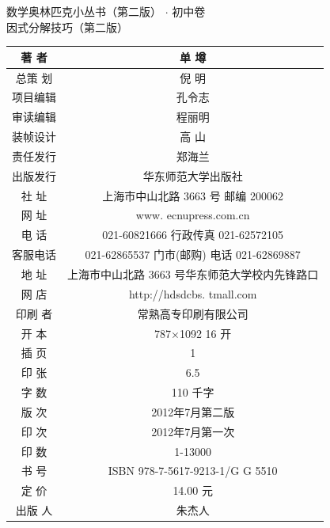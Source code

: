 \documentclass[10pt]{article}
\begin{document}
数学奥林匹克小丛书（第二版） $\cdot$ 初中卷\\
因式分解技巧（第二版）

\begin{center}
\begin{tabular}{|c|c|}
\hline
著 者 & 单 墫 \\
\hline
总策 划 & 倪 明 \\
\hline
项目编辑 & 孔令志 \\
\hline
审读编辑 & 程丽明 \\
\hline
装帧设计 & 高 山 \\
\hline
责任发行 & 郑海兰 \\
\hline
出版发行 & 华东师范大学出版社 \\
\hline
社 址 & 上海市中山北路 3663 号 邮编 200062 \\
\hline
网 址 & www. ecnupress.com.cn \\
\hline
电 话 & 021-60821666 行政传真 021-62572105 \\
\hline
客服电话 & 021-62865537 门市(邮购) 电话 021-62869887 \\
\hline
地 址 & 上海市中山北路 3663 号华东师范大学校内先锋路口 \\
\hline
网 店 & http://hdsdcbs. tmall.com \\
\hline
印刷 者 & 常熟高专印刷有限公司 \\
\hline
开 本 & 787×1092 16 开 \\
\hline
插 页 & 1 \\
\hline
印 张 & 6.5 \\
\hline
字 数 & 110 千字 \\
\hline
版 次 & 2012年7月第二版 \\
\hline
印 次 & 2012年7月第一次 \\
\hline
印 数 & 1-13000 \\
\hline
书 号 & ISBN 978-7-5617-9213-1/G G 5510 \\
\hline
定 价 & 14.00 元 \\
\hline
出版 人 & 朱杰人 \\
\hline
\end{tabular}
\end{center}
\end{document}
